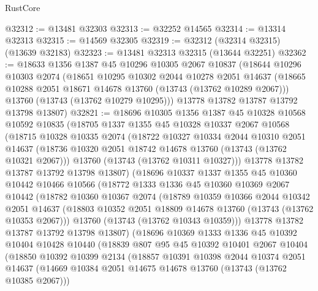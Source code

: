 \begin{lexlean}{RustCore}
\begin{coremodule}
@32312 := @13481 @32303
@32313 := @32252 @14565
@32314 := @13314 @32313
@32315 := @14569 @32305
@32319 := @32312 (@32314 @32315) (@13639 @32183)
@32323 := @13481 @32313 @32315 (@13644 @32251)
@32362 := @18633
    @1356
    @1387
    @45
    @10296
    @10305
    @2067
    @10837
    (@18644
      @10296
      @10303
      @2074
      (@18651
        @10295
        @10302
        @2044
        @10278
        @2051
        @14637
        (@18665 @10288 @2051 @18671 @14678 @13760 (@13743 (@13762 @10289 @2067)))
        @13760
        (@13743 (@13762 @10279 @10295)))
      @13778
      @13782
      @13787
      @13792
      @13798
      @13807)
@32821 := @18696
    @10305
    @1356
    @1387
    @45
    @10328
    @10568
    @10592
    @10835
    (@18705
      @1337
      @1355
      @45
      @10328
      @10337
      @2067
      @10568
      (@18715
        @10328
        @10335
        @2074
        (@18722
          @10327
          @10334
          @2044
          @10310
          @2051
          @14637
          (@18736 @10320 @2051 @18742 @14678 @13760 (@13743 (@13762 @10321 @2067)))
          @13760
          (@13743 (@13762 @10311 @10327)))
        @13778
        @13782
        @13787
        @13792
        @13798
        @13807)
      (@18696
        @10337
        @1337
        @1355
        @45
        @10360
        @10442
        @10466
        @10566
        (@18772
          @1333
          @1336
          @45
          @10360
          @10369
          @2067
          @10442
          (@18782
            @10360
            @10367
            @2074
            (@18789
              @10359
              @10366
              @2044
              @10342
              @2051
              @14637
              (@18803 @10352 @2051 @18809 @14678 @13760 (@13743 (@13762 @10353 @2067)))
              @13760
              (@13743 (@13762 @10343 @10359)))
            @13778
            @13782
            @13787
            @13792
            @13798
            @13807)
          (@18696
            @10369
            @1333
            @1336
            @45
            @10392
            @10404
            @10428
            @10440
            (@18839
              @807
              @95
              @45
              @10392
              @10401
              @2067
              @10404
              (@18850
                @10392
                @10399
                @2134
                (@18857
                  @10391
                  @10398
                  @2044
                  @10374
                  @2051
                  @14637
                  (@14669 @10384 @2051 @14675 @14678 @13760 (@13743 (@13762 @10385 @2067)))

\end{coremodule}
\end{lexlean}
